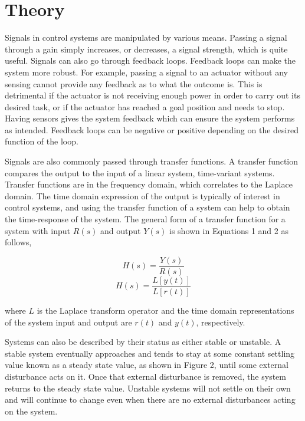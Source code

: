 \documentclass[12pt]{article}
\begin{document}
\newpage


\section*{\fontsize{12}{12}\selectfont \large Theory}
Signals in control systems are manipulated by various means. Passing a signal through a gain simply increases, or decreases, a signal strength, which is quite useful. Signals can also go through feedback loops. Feedback loops can make the system more robust. For example, passing a signal to an actuator without any sensing cannot provide any feedback as to what the outcome is. This is detrimental if the actuator is not receiving enough power in order to carry out its desired task, or if the actuator has reached a goal position and needs to stop. Having sensors gives the system feedback which can ensure the system performs as intended. Feedback loops can be negative or positive depending on the desired function of the loop. 
\bigskip

Signals are also commonly passed through transfer functions. A transfer function compares the output to the input of a linear system, time-variant systems. Transfer functions are in the frequency domain, which correlates to the Laplace domain. The time domain expression of the output is typically of interest in control systems, and using the transfer function of a system can help to obtain the time-response of the system. The general form of a transfer function for a system with input $R(s)$ and output $Y(s)$ is shown in Equations 1 and 2 as follows,
\bigskip

\begin{equation}
H(s) = \frac{Y(s)}{R(s)} 
\end{equation}
\begin{equation}
H(s) = \frac{L[y(t)]}{L[r(t)]}
\end{equation}
\bigskip

where $L$ is the Laplace transform operator and the time domain representations of the system input and output are $r(t)$ and $y(t)$, respectively.
\bigskip

Systems can also be described by their status as either stable or unstable. A stable system eventually approaches and tends to stay at some constant settling value known as a steady state value, as shown in Figure 2, until some external disturbance acts on it. Once that external disturbance is removed, the system returns to the steady state value. Unstable systems will not settle on their own and will continue to change even when there are no external disturbances acting on the system.
\bigskip
\end{document}
